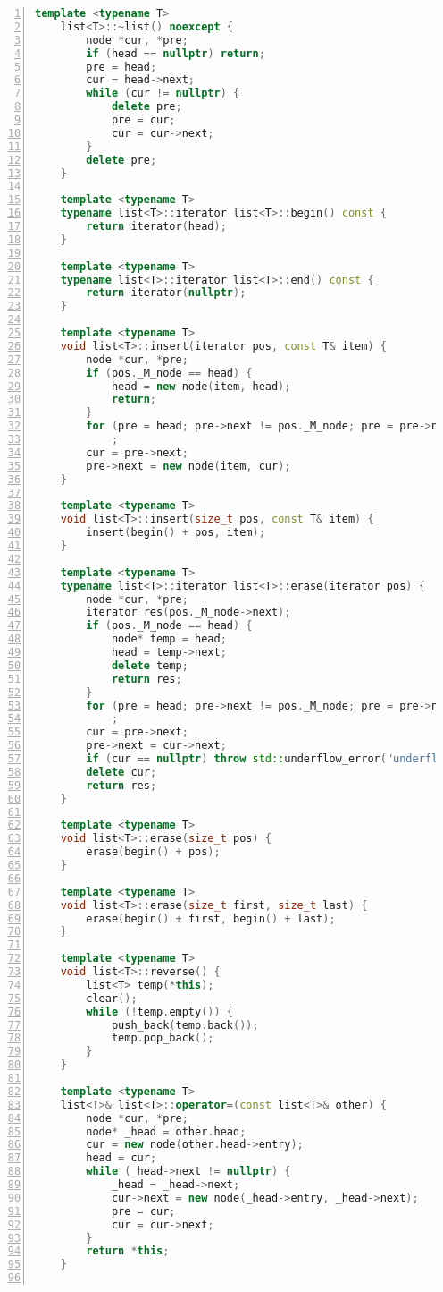 \documentclass{article}
\begin{document}
\begin{lstlisting}[xleftmargin = 2em,xrightmargin = 2em, aboveskip = 0.5em, numbers = left, language = C++]
    template <typename T>
    list<T>::~list() noexcept {
        node *cur, *pre;
        if (head == nullptr) return;
        pre = head;
        cur = head->next;
        while (cur != nullptr) {
            delete pre;
            pre = cur;
            cur = cur->next;
        }
        delete pre;
    }

    template <typename T>
    typename list<T>::iterator list<T>::begin() const {
        return iterator(head);
    }

    template <typename T>
    typename list<T>::iterator list<T>::end() const {
        return iterator(nullptr);
    }

    template <typename T>
    void list<T>::insert(iterator pos, const T& item) {
        node *cur, *pre;
        if (pos._M_node == head) {
            head = new node(item, head);
            return;
        }
        for (pre = head; pre->next != pos._M_node; pre = pre->next)
            ;
        cur = pre->next;
        pre->next = new node(item, cur);
    }

    template <typename T>
    void list<T>::insert(size_t pos, const T& item) {
        insert(begin() + pos, item);
    }

    template <typename T>
    typename list<T>::iterator list<T>::erase(iterator pos) {
        node *cur, *pre;
        iterator res(pos._M_node->next);
        if (pos._M_node == head) {
            node* temp = head;
            head = temp->next;
            delete temp;
            return res;
        }
        for (pre = head; pre->next != pos._M_node; pre = pre->next)
            ;
        cur = pre->next;
        pre->next = cur->next;
        if (cur == nullptr) throw std::underflow_error("underflow");
        delete cur;
        return res;
    }

    template <typename T>
    void list<T>::erase(size_t pos) {
        erase(begin() + pos);
    }

    template <typename T>
    void list<T>::erase(size_t first, size_t last) {
        erase(begin() + first, begin() + last);
    }

    template <typename T>
    void list<T>::reverse() {
        list<T> temp(*this);
        clear();
        while (!temp.empty()) {
            push_back(temp.back());
            temp.pop_back();
        }
    }

    template <typename T>
    list<T>& list<T>::operator=(const list<T>& other) {
        node *cur, *pre;
        node* _head = other.head;
        cur = new node(other.head->entry);
        head = cur;
        while (_head->next != nullptr) {
            _head = _head->next;
            cur->next = new node(_head->entry, _head->next);
            pre = cur;
            cur = cur->next;
        }
        return *this;
    }


\end{lstlisting}
\end{document}
